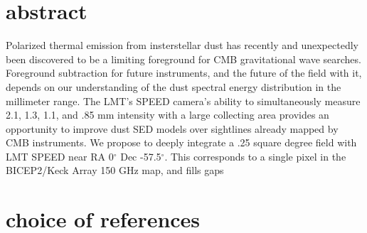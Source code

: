 \documentclass[12pt]{article}
\begin{document}
\newcommand{\araa}{Annual Review of Astron and Astrophys}
\newcommand{\aap}{Astronomy and Astrophysics}

\section*{abstract}

Polarized thermal emission from insterstellar dust has recently and unexpectedly been discovered to be a limiting foreground for CMB gravitational wave searches. Foreground subtraction for future instruments, and the future of the field with it, depends on our understanding of the dust spectral energy distribution in the millimeter range. The LMT's SPEED camera's ability to simultaneously measure 2.1, 1.3, 1.1, and .85 mm intensity with a large collecting area provides an opportunity to improve dust SED models over sightlines already mapped by CMB instruments. We propose to deeply integrate a .25 square degree field with LMT SPEED near RA 0\(^\circ\) Dec -57.5\(^\circ\). This corresponds to a single pixel in the BICEP2/Keck Array 150 GHz map, and fills gaps

\section*{choice of references}

\cite{andersson}



\end{document}
